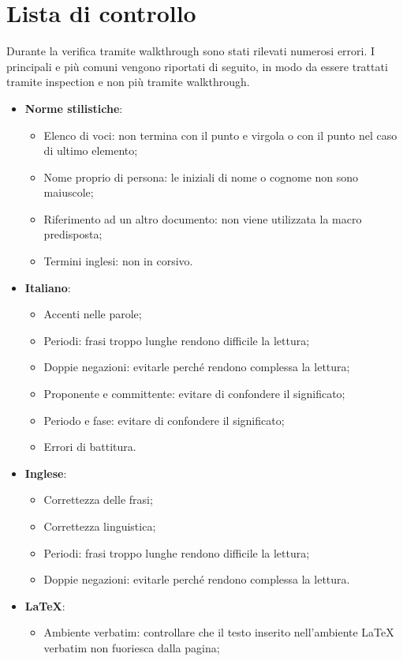 \newpage
\section{Lista di controllo}
Durante la verifica tramite walkthrough sono stati rilevati numerosi errori. I principali e più comuni vengono riportati di seguito, in modo da essere trattati tramite inspection e non più tramite walkthrough.
\begin{itemize}
\item \textbf{Norme stilistiche}:
	\begin{itemize}
	\item Elenco di voci: non termina con il punto e virgola o con il punto nel caso di ultimo elemento;
	\item Nome proprio di persona: le iniziali di nome o cognome non sono maiuscole;
	\item Riferimento ad un altro documento: non viene utilizzata la macro predisposta;
	\item Termini inglesi: non in corsivo.
	\end{itemize}
\item \textbf{Italiano}:
	\begin{itemize}
	\item Accenti nelle parole;
	\item Periodi: frasi troppo lunghe rendono difficile la lettura;
	\item Doppie negazioni: evitarle perché rendono complessa la lettura;
	\item Proponente e committente: evitare di confondere il significato;
	\item Periodo e fase: evitare di confondere il significato;
	\item Errori di battitura.
	\end{itemize}
\item \textbf{Inglese}:
	\begin{itemize}
	\item Correttezza delle frasi;
	\item Correttezza linguistica;
	\item Periodi: frasi troppo lunghe rendono difficile la lettura;
	\item Doppie negazioni: evitarle perché rendono complessa la lettura.
	\end{itemize}
\item \textbf{\LaTeX}:
	\begin{itemize}
	\item Ambiente verbatim: controllare che il testo inserito nell'ambiente \LaTeX{} verbatim non fuoriesca dalla pagina;

\end{itemize}
\end{itemize}

